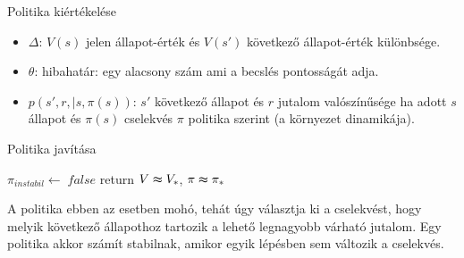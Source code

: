 \documentclass[english, aspectratio=169]{beamer}
\begin{document}
\begin{frame}
\begin{algorithm}[H]
\caption{Politika kiértékelése}
\SetAlgoLined
\end{algorithm}
\begin{itemize}
	\item $\Delta$: $V(s)$ jelen állapot-érték és $V(s')$ következő állapot-érték különbsége.
	\item $\theta$: hibahatár: egy alacsony szám ami a becslés pontosságát adja.
	\item $p\left(s',r,|s,\pi(s)\right)$: $s'$ következő állapot és $r$ jutalom valószínűsége ha adott $s$ állapot és $\pi(s)$ cselekvés $\pi$ politika szerint (a környezet dinamikája).
\end{itemize}
\end{frame}

\begin{frame}
\begin{algorithm}[H]
\caption{Politika javítása}
\SetAlgoLined
	$\pi_{instabil} \leftarrow\; false$
	return $V \thickapprox V_{*}$, $\pi \thickapprox \pi_{*}$
\end{algorithm}
A politika ebben az esetben mohó, tehát úgy választja ki a cselekvést, hogy melyik következő állapothoz tartozik a lehető legnagyobb várható jutalom. Egy politika akkor számít stabilnak, amikor egyik lépésben sem változik a cselekvés. 
\end{frame}
\end{document}
